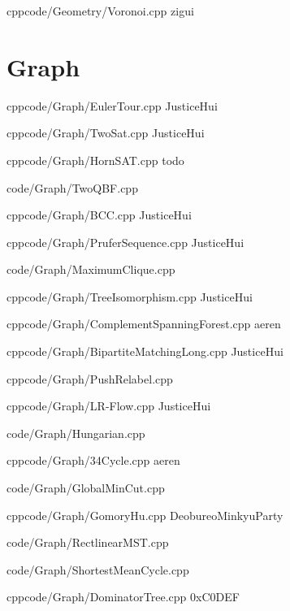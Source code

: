 \documentclass[landscape, 8pt, a4paper, oneside]{extarticle}
\begin{document}
\begin{multicols*}{3}
{}{}
{cpp}{code/Geometry/Voronoi.cpp}
{zigui}

\section{Graph}

{}{}
{cpp}{code/Graph/EulerTour.cpp}
{JusticeHui}

{}{}
{cpp}{code/Graph/TwoSat.cpp}
{JusticeHui}

{}{}
{cpp}{code/Graph/HornSAT.cpp}
{todo}

{code/Graph/TwoQBF.cpp}

{}{}
{cpp}{code/Graph/BCC.cpp}
{JusticeHui}

{}{}
{cpp}{code/Graph/PruferSequence.cpp}
{JusticeHui}

{code/Graph/MaximumClique.cpp}

{}{}
{cpp}{code/Graph/TreeIsomorphism.cpp}
{JusticeHui}

{}{}
{cpp}{code/Graph/ComplementSpanningForest.cpp}
{aeren}

{}{}
{cpp}{code/Graph/BipartiteMatchingLong.cpp}
{JusticeHui}

{}{}
{cpp}{code/Graph/PushRelabel.cpp}
{}

{}{}
{cpp}{code/Graph/LR-Flow.cpp}
{JusticeHui}

{code/Graph/Hungarian.cpp} %

{}{}
{cpp}{code/Graph/34Cycle.cpp}
{aeren}

{code/Graph/GlobalMinCut.cpp}

{}{}
{cpp}{code/Graph/GomoryHu.cpp}
{DeobureoMinkyuParty}

{code/Graph/RectlinearMST.cpp}

{code/Graph/ShortestMeanCycle.cpp}

{}{}
{cpp}{code/Graph/DominatorTree.cpp}
{0xC0DEF}


\end{multicols*}
\end{document}
